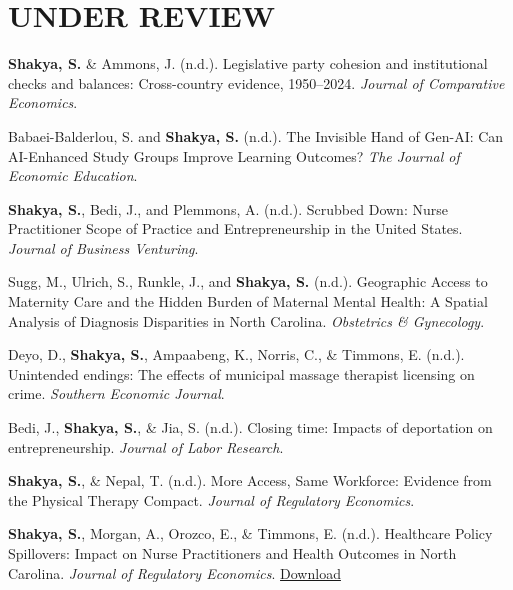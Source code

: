 \section*{UNDER REVIEW}
\begin{etaremune}
\item \textbf{Shakya, S.} \& Ammons, J. (n.d.). Legislative party cohesion and institutional checks and balances: Cross-country evidence, 1950--2024. \textit{Journal of Comparative Economics}.
\item Babaei-Balderlou, S. and \textbf{Shakya, S.} (n.d.). The Invisible Hand of Gen-AI: Can AI-Enhanced Study Groups Improve Learning Outcomes? \textit{The Journal of Economic Education}.
\item \textbf{Shakya, S.}, Bedi, J., and Plemmons, A. (n.d.). Scrubbed Down: Nurse Practitioner Scope of Practice and Entrepreneurship in the United States. \textit{Journal of Business Venturing}.
\item Sugg, M., Ulrich, S., Runkle, J., and \textbf{Shakya, S.} (n.d.). Geographic Access to Maternity Care and the Hidden Burden of Maternal Mental Health: A Spatial Analysis of Diagnosis Disparities in North Carolina. \textit{Obstetrics \& Gynecology}.
\item Deyo, D., \textbf{Shakya, S.}, Ampaabeng, K., Norris, C., \& Timmons, E. (n.d.). Unintended endings: The effects of municipal massage therapist licensing on crime. \textit{Southern Economic Journal}.
\item Bedi, J., \textbf{Shakya, S.}, \& Jia, S. (n.d.). Closing time: Impacts of deportation on entrepreneurship. \textit{Journal of Labor Research}. %
\item \textbf{Shakya, S.}, \& Nepal, T. (n.d.). More Access, Same Workforce: Evidence from the Physical Therapy Compact. \textit{Journal of Regulatory Economics}.
\item \textbf{Shakya, S.}, Morgan, A., Orozco, E., \& Timmons, E. (n.d.). Healthcare Policy Spillovers: Impact on Nurse Practitioners and Health Outcomes in North Carolina. \textit{Journal of Regulatory Economics}. \hfill \href{https://ssrn.com/abstract=6064866}{Download}

\end{etaremune}


